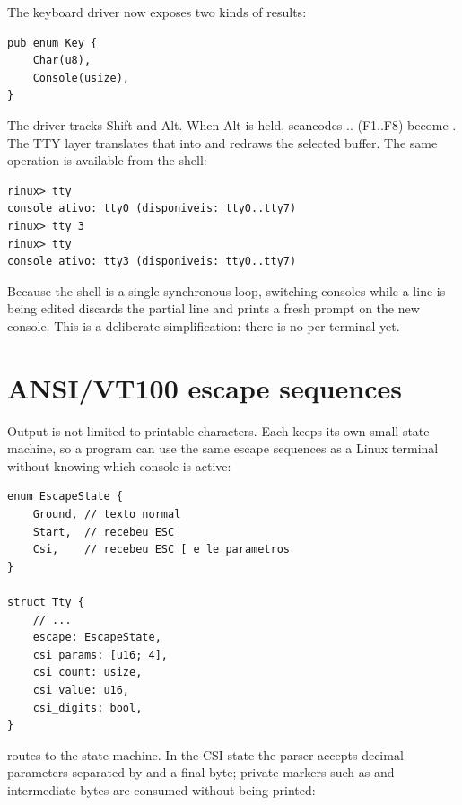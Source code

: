 The keyboard driver now exposes two kinds of results:

\begin{lstlisting}[caption={Keyboard result type.},label={lst:keyenum}]
pub enum Key {
    Char(u8),
    Console(usize),
}
\end{lstlisting}

The driver tracks Shift and Alt. When Alt is held, scancodes
.. (F1..F8) become . The TTY
layer translates that into  and redraws the selected
buffer. The same operation is available from the shell:

\begin{lstlisting}[style=shell,caption={Switching consoles from the shell.},label={lst:ttyshell}]
rinux> tty
console ativo: tty0 (disponiveis: tty0..tty7)
rinux> tty 3
rinux> tty
console ativo: tty3 (disponiveis: tty0..tty7)
\end{lstlisting}

Because the shell is a single synchronous loop, switching consoles while a
line is being edited discards the partial line and prints a fresh prompt on
the new console. This is a deliberate simplification: there is no
 per terminal yet.

\section{ANSI/VT100 escape sequences}

Output is not limited to printable characters. Each  keeps its own
small state machine, so a program can use the same escape sequences as a
Linux terminal without knowing which console is active:

\begin{lstlisting}[caption={Escape state stored in each console.},label={lst:ttyescape}]
enum EscapeState {
    Ground, // texto normal
    Start,  // recebeu ESC
    Csi,    // recebeu ESC [ e le parametros
}

struct Tty {
    // ...
    escape: EscapeState,
    csi_params: [u16; 4],
    csi_count: usize,
    csi_value: u16,
    csi_digits: bool,
}
\end{lstlisting}

 routes  to the state machine. In the CSI state
the parser accepts decimal parameters separated by \code{;} and a final byte;
private markers such as  and intermediate bytes are consumed without
being printed:

